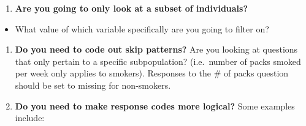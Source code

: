 \documentclass[]{article}
\providecommand{\tightlist}{%
  \setlength{\itemsep}{0pt}\setlength{\parskip}{0pt}}
\begin{document}
\begin{enumerate}
\def\labelenumi{\arabic{enumi}.}
\setcounter{enumi}{2}
\tightlist
\item
  \textbf{Are you going to only look at a subset of individuals?}
\end{enumerate}

\begin{itemize}
\tightlist
\item
  What value of which variable specifically are you going to filter on?
\end{itemize}

\begin{enumerate}
\def\labelenumi{\arabic{enumi}.}
\setcounter{enumi}{3}
\item
  \textbf{Do you need to code out skip patterns?} Are you looking at
  questions that only pertain to a specific subpopulation? (i.e.~number
  of packs smoked per week only applies to smokers). Responses to the \#
  of packs question should be set to missing for non-smokers.
\item
  \textbf{Do you need to make response codes more logical?} Some
  examples include:
\end{enumerate}
\end{document}
